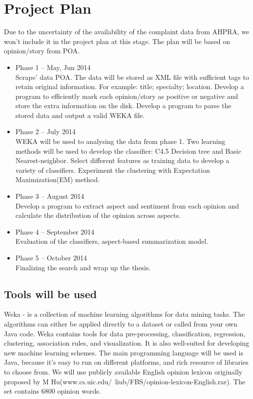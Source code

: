 \documentclass[10pt,twocolumn]{article}
\begin{document}
\section{Project Plan}
Due to the uncertainty of the availability of the complaint data from AHPRA, we won’t include it in the project plan at this stage. The plan will be based on opinion/story from POA.
\begin{itemize}
\item Phase 1 – May, Jun 2014\\
Scrape’ data POA. The data will be stored as XML file with sufficient tags to retain original information. For example: title; specialty; location. Develop a program to efficiently mark each opinion/story as positive or negative and store the extra information on the disk. Develop a program to parse the stored data and output a valid WEKA file.
\item Phase 2 – July 2014\\
WEKA will be used to analysing the data from phase 1. Two learning methods will be used to develop the classifier: C4.5 Decision tree and Basic Nearest-neighbor. Select different features as training data to develop a variety of classifiers.
Experiment the clustering with Expectation Maximization(EM) method.
\item Phase 3 – August 2014\\
Develop a program to extract aspect and sentiment from each opinion and calculate the distribution of the opinion across aspects.
\item Phase 4 – September 2014\\
Evaluation of the classifiers, aspect-based summarization model.
\item Phase 5 – October 2014\\
Finalizing the search and wrap up the thesis.
\end{itemize}

\subsection{Tools will be used}
Weka\cite{ref7} - is a collection of machine learning algorithms for data mining tasks. The algorithms can either be applied directly to a dataset or called from your own Java code. Weka contains tools for data pre-processing, classification, regression, clustering, association rules, and visualization. It is also well-suited for developing new machine learning schemes.
The main programming language will be used is Java, because it’s easy to run on different platforms, and rich resource of libraries to choose from. 
We will use publicly available English opinion lexicon originally proposed by M Hu\cite{ref23}(www.cs.uic.edu/~liub/FBS/opinion-lexicon-English.rar). The set contains 6800 opinion words. 
\end{document}
